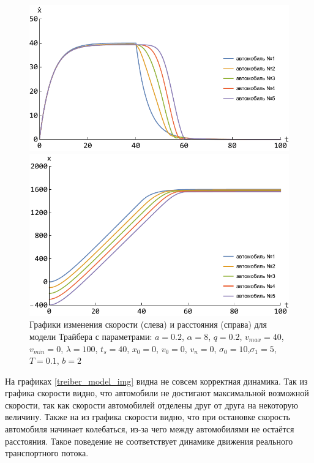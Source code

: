 \documentclass[12pt, a4paper]{extarticle}
\numberwithin{equation}{section}
\begin{document}
\begin{figure}[h!]
	\begin{center}
		\begin{minipage}[h!]{0.48\linewidth}
			\includegraphics[width=1\linewidth,height=0.2\textheight]
			{Images/treiber_model_speed.pdf}
		\end{minipage}
		\hfill 
		\begin{minipage}[h!]{0.48\linewidth}
			\includegraphics[width=1\linewidth,height=0.2\textheight]
			{Images/treiber_model_distance.pdf}
		\end{minipage}
		\caption{Графики изменения скорости (слева) и расстояния (справа) для модели Трайбера с параметрами: $a=0.2$, $\alpha=8$, $q=0.2$, $v_{max}=40$, $v_{min}=0$, $\lambda=100$, $t_s=40$, $x_0=0$, $v_0=0$, $v_n=0$, $\sigma_0=10$,$\sigma_1=5$, $T=0.1$, $b=2$ }
		\label{treiber_model_img}
	\end{center}
\end{figure}

На графиках \eqref{treiber_model_img} видна не совсем корректная динамика. Так из графика скорости видно, что автомобили не достигают максимальной возможной скорости, так как скорости автомобилей отделены друг от друга на некоторую величину. Также на из графика скорости видно, что при остановке скорость автомобиля начинает колебаться, из-за чего между автомобилями не остаётся расстояния. Такое поведение не соответствует динамике движения реального транспортного потока. 
\end{document}
